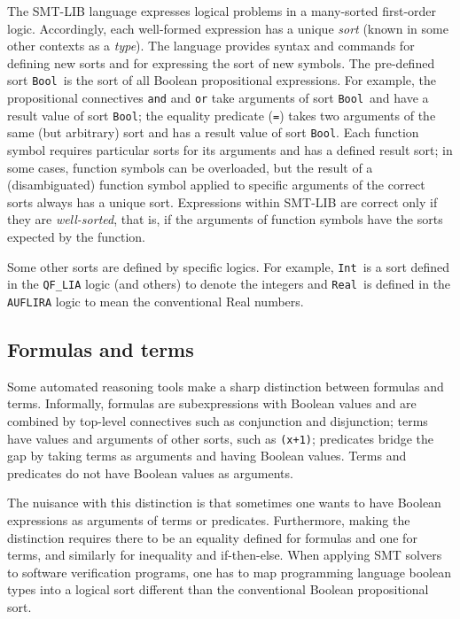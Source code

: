 \documentclass[12pt,oneside]{report}
\newcommand{\Bool}{{\tt Bool}}
\newcommand{\Int}{{\tt Int}}
\newcommand{\Real}{{\tt Real}}
\begin{document}
The SMT-LIB language expresses logical problems in a many-sorted first-order logic. 
Accordingly, each well-formed expression has a unique {\it sort} (known in some other contexts as
a {\it type}).  The language provides syntax and commands for defining new sorts and for
expressing the sort of new symbols.  The pre-defined sort \Bool~is the sort of all 
Boolean propositional expressions.  For example, the propositional connectives {\tt and} and {\tt or} take arguments of sort \Bool~and have a result value of sort \Bool; the 
equality predicate ({\tt =}) takes two arguments of the same (but arbitrary) sort
and has a result value of sort \Bool.  Each function symbol requires particular sorts for its arguments and has
a defined result sort; in some cases, function symbols can be overloaded, but the result of a (disambiguated) function symbol
applied to specific arguments of the correct sorts always has a unique sort.  Expressions within SMT-LIB are correct only if they
are {\it well-sorted}, that is, if the arguments of function symbols have the sorts expected by the function.

Some other sorts are defined by specific logics.  For example, \Int~is a sort defined in
the {\tt QF\_LIA} logic (and others) to denote the integers and \Real~is defined in the {\tt AUFLIRA} logic to mean the conventional Real numbers.


\subsection{Formulas and terms}

Some automated reasoning tools make a sharp distinction between formulas and terms.  Informally, formulas are subexpressions with Boolean values and are combined by top-level connectives such as conjunction and disjunction; terms have values and arguments of other sorts, such as {\tt (x+1)}; predicates bridge the gap by taking terms as arguments and having Boolean values. Terms and predicates do not have Boolean values as arguments.

The nuisance with this distinction is that sometimes one wants to have Boolean expressions as arguments of terms or predicates.  Furthermore, making the distinction requires there to be an equality defined for formulas and one for terms, and similarly for inequality and if-then-else. 
When applying SMT solvers to software verification programs, one has to map programming language boolean types into a logical sort different than the conventional Boolean propositional sort.
\end{document}
